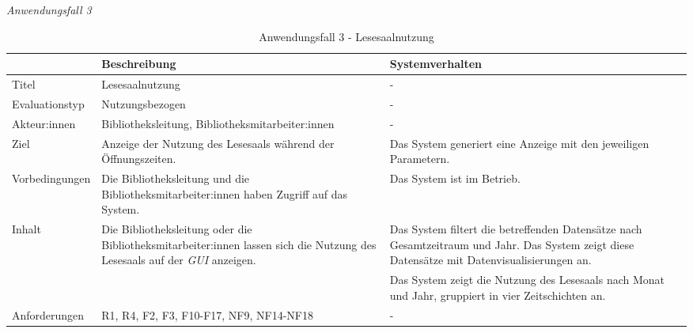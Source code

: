\newpage
\noindent
\textit{Anwendungsfall 3}

\begingroup
\setlength{\tabcolsep}{10pt} %
\renewcommand{\arraystretch}{1.25} 
\begin{table}[h]
    \centering
    \begin{adjustbox}{max width=\textwidth}
    \begin{tabular}{lp{7.0cm}p{7.0cm}}
       \toprule
       \textbf{}          & \textbf{Beschreibung} &\textbf{Systemverhalten}\\
       \midrule
        Titel                            &Lesesaalnutzung& -\\
        Evaluationstyp                   &Nutzungsbezogen                   & -\\
        Akteur:innen                     &Bibliotheksleitung, Bibliotheksmitarbeiter:innen& -\\
        Ziel                             &Anzeige der Nutzung des Lesesaals während der Öffnungszeiten.& Das System generiert eine Anzeige mit den jeweiligen Parametern.\\
        Vorbedingungen                   &Die Bibliotheksleitung und die Bibliotheksmitarbeiter:innen haben Zugriff auf das System.& Das System ist im Betrieb.\\
        Inhalt                          &Die Bibliotheksleitung oder die Bibliotheksmitarbeiter:innen lassen sich die Nutzung des Lesesaals auf der \textit{\acrshort{GUI}} anzeigen. & Das System filtert die betreffenden Datensätze nach Gesamtzeitraum und Jahr. Das System zeigt diese Datensätze mit Datenvisualisierungen an.\\
                                         & &Das System zeigt die Nutzung des Lesesaals nach Monat und Jahr, gruppiert in vier Zeitschichten an.\\

        Anforderungen                   &R1, R4, F2, F3, F10-F17, NF9, NF14-NF18& -\\
        \bottomrule
    \end{tabular}
    \end{adjustbox}
    \caption{%
    Anwendungsfall 3 - Lesesaalnutzung    }
    \label{tab:AF_Lesesaalnutzung}
    \end{table}
\endgroup


